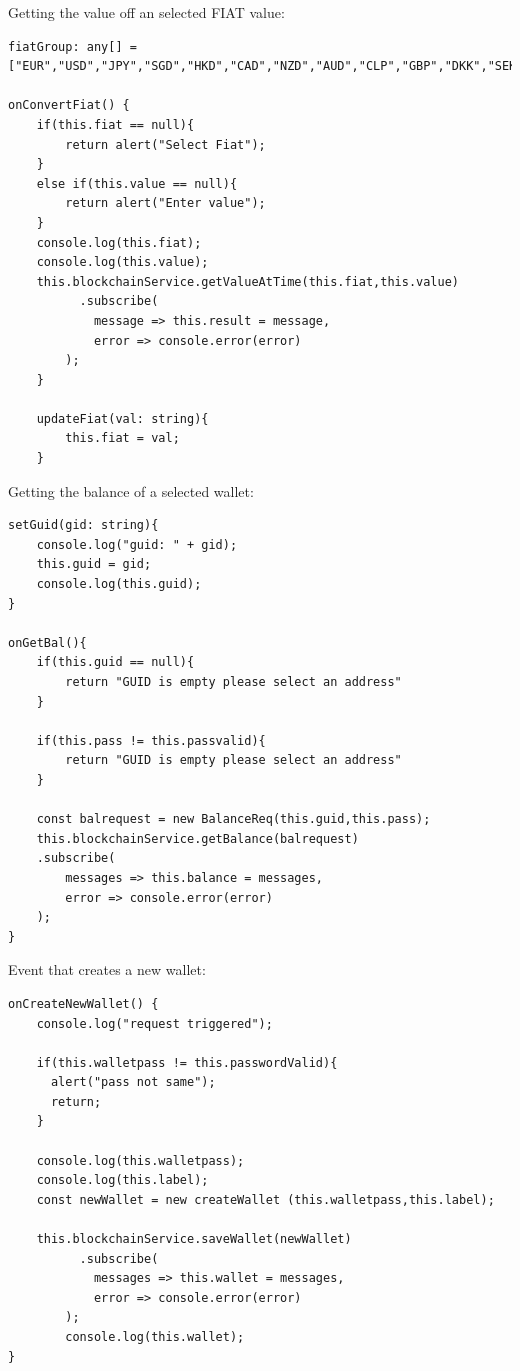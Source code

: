 Getting the value off an selected FIAT value:
\begin{lstlisting}
fiatGroup: any[] = ["EUR","USD","JPY","SGD","HKD","CAD","NZD","AUD","CLP","GBP","DKK","SEK","ISK","CHF","BRL","RUB","PLN","THB","KRW","TWD"];

onConvertFiat() {
    if(this.fiat == null){
        return alert("Select Fiat");
    }
    else if(this.value == null){
        return alert("Enter value");
    }
    console.log(this.fiat);
    console.log(this.value);
    this.blockchainService.getValueAtTime(this.fiat,this.value)
          .subscribe(
            message => this.result = message,
            error => console.error(error)
        );
    }

    updateFiat(val: string){
        this.fiat = val;
    }

\end{lstlisting}

Getting the balance of a selected wallet:
\begin{lstlisting}
setGuid(gid: string){
    console.log("guid: " + gid);
    this.guid = gid;
    console.log(this.guid);
}

onGetBal(){
    if(this.guid == null){
        return "GUID is empty please select an address"
    }

    if(this.pass != this.passvalid){
        return "GUID is empty please select an address"
    }

    const balrequest = new BalanceReq(this.guid,this.pass);
    this.blockchainService.getBalance(balrequest)
    .subscribe(
        messages => this.balance = messages,
        error => console.error(error)
    );
}
\end{lstlisting}

Event that creates a new wallet:
\begin{lstlisting}
onCreateNewWallet() {
    console.log("request triggered");

    if(this.walletpass != this.passwordValid){
      alert("pass not same");
      return;
    }

    console.log(this.walletpass);
    console.log(this.label);
    const newWallet = new createWallet (this.walletpass,this.label);
    
    this.blockchainService.saveWallet(newWallet)
          .subscribe(
            messages => this.wallet = messages,
            error => console.error(error)
        );
        console.log(this.wallet);
}
\end{lstlisting}

